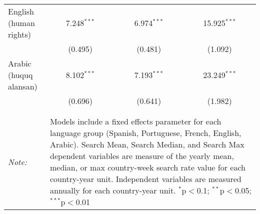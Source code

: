 \begin{table}[!htbp]
\begin{tabular}{@{\extracolsep{5pt}}lccc}
  English (human rights) & 7.248$^{***}$ & 6.974$^{***}$ & 15.925$^{***}$ \\ 
  & (0.495) & (0.481) & (1.092) \\ 
  Arabic (huquq alansan) & 8.102$^{***}$ & 7.193$^{***}$ & 23.249$^{***}$ \\ 
  & (0.696) & (0.641) & (1.982) \\ 
 \hline \\[-1.8ex] 
\hline 
\hline \\[-1.8ex] 
\textit{Note:}  & \multicolumn{3}{l}{\parbox[t]{8cm}{Models include a fixed effects parameter for each language group (Spanish, Portuguese, French, English, Arabic). Search Mean, Search Median, and Search Max dependent variables are measure of the yearly mean, median, or max country-week search rate value for each country-year unit. Independent variables are measured annually for each country-year unit. $^{*}$p$<$0.1; $^{**}$p$<$0.05; $^{***}$p$<$0.01}} \\ 
\end{tabular} 
\end{table} 
